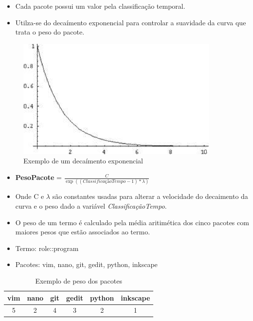 \begin{frame}
    \begin{itemize}
        \item Cada pacote possui um valor pela classificação temporal.
        \item Utilza-se do decaímento exponencial para controlar a suavidade da
curva que trata o peso do pacote.
    \end{itemize}

    \begin{figure}[h]
      \centering
      \includegraphics[width=0.9\textwidth]{figura/decaimento_exponencial.eps}
      \caption{Exemplo de um decaímento exponencial}
      \label{fig:curva_aprendizado}
    \end{figure}
\end{frame}

\begin{frame}
\begin{itemize}
    \item \textbf{PesoPacote} = $\frac{C}{\exp\left(({ClassificaçãoTempo - 1}) * {\lambda}\right)}$
    \item Onde C e ${\lambda}$ são constantes usadas para alterar a velocidade do
decaimento da curva e o peso dado a variável \textit{ClassificaçãoTempo}.
\end{itemize}
\end{frame}

\begin{frame}
    \begin{itemize}
        \item O peso de um termo é calculado pela média aritimética dos cinco
pacotes com maiores pesos que estão associados
ao termo.
        \item Termo: role::program
        \item Pacotes: vim, nano, git, gedit, python, inkscape
    \end{itemize}
    \begin{table}[h]
    \centering
    \begin{tabular}{cccccc}
    \hline
    \rowcolor[HTML]{EFEFEF}
    {vim} & {nano} & {git} & {gedit} & {python} & {inkscape} \\ \hline
    {5} & {2} & {4} & {3} & {2} & {1} \\ \hline
    \end{tabular}
    \caption{Exemplo de peso dos pacotes}
    \label{tab:classificacao_pacotes}
    \end{table}
\end{frame}

